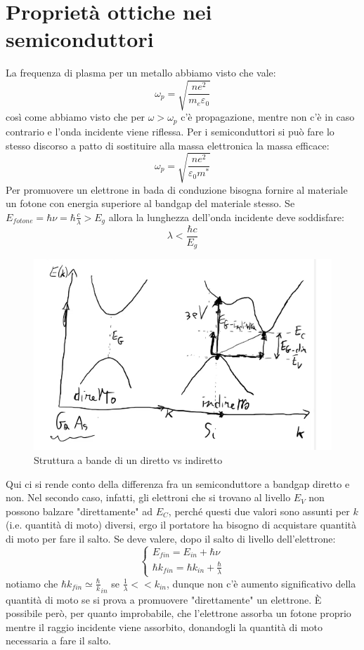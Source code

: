 \documentclass{book}
\begin{document}
    \section{Proprietà ottiche nei semiconduttori}
        La frequenza di plasma per un metallo abbiamo visto che vale:
        $$\omega_{p} = \sqrt{\frac{ne^{2}}{m_{e}\varepsilon_{0}}}$$
        così come abbiamo visto che per $\omega > \omega_{p}$ c'è propagazione, mentre non c'è in caso contrario e l'onda incidente viene riflessa. Per i semiconduttori si può fare lo stesso discorso a patto di sostituire alla massa elettronica la massa efficace:
        $$\omega_{p} = \sqrt{\frac{n e^{2}}{\varepsilon_{0}m^{*}}}$$
        Per promuovere un elettrone in bada di conduzione bisogna fornire al materiale un fotone con energia superiore al bandgap del materiale stesso. Se $E_{fotone} = \hbar \nu = \hbar \frac{c}{\lambda}>E_{g}$ allora la lunghezza dell'onda incidente deve soddisfare:
        $$\lambda < \frac{\hbar c}{E_{g}}$$
        \begin{figure}
            \centering
            \includegraphics[width=0.5\linewidth]{img/blackholesun.png}
            \caption{Struttura a bande di un diretto vs indiretto}
        \end{figure}
        Qui ci si rende conto della differenza fra un semiconduttore a bandgap diretto e non. Nel secondo caso, infatti, gli elettroni che si trovano al livello $E_{V}$ non possono balzare "direttamente" ad $E_{C}$, perché questi due valori sono assunti per $k$ (i.e. quantità di moto) diversi, ergo il portatore ha bisogno di acquistare quantità di moto per fare il salto.
        Se deve valere, dopo il salto di livello dell'elettrone:
        $$\begin{cases}
            E_{fin} = E_{in}+\hbar \nu \\
            \hbar k_{fin} = \hbar k_{in} + \frac{\hbar}{\lambda}
        \end{cases}$$
        notiamo che $\displaystyle \hbar k_{fin} \simeq \frac{\hbar}k_{in}$ se $\displaystyle \frac{1}{\lambda} << k_{in}$, dunque non c'è aumento significativo della quantità di moto se si prova a promuovere "direttamente" un elettrone. È possibile però, per quanto improbabile, che l'elettrone assorba un fotone proprio mentre il raggio incidente viene assorbito, donandogli la quantità di moto necessaria a fare il salto.\\
\end{document}
